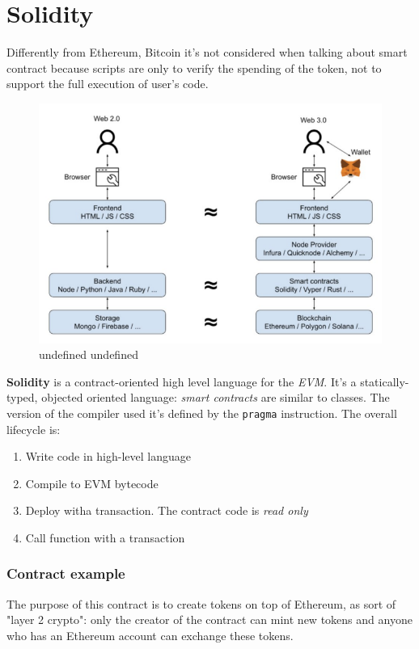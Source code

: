 \documentclass[10pt,a4paper]{report}
\begin{document}
\section{Solidity}\label{sec:solidity}
Differently from Ethereum, Bitcoin it's not considered when talking about smart contract because scripts are only to verify the spending of the token, not to support the full execution of user's code.
\begin{figure}[h!]
	\centering
	\includegraphics[scale=0.40]{images/Pasted image 20230421143519.png}
	\caption{undefined undefined}
\end{figure}


\textbf{Solidity} is a contract-oriented high level language for the \textit{EVM}. It's a statically-typed, objected oriented language: \textit{smart contracts} are similar to classes. The version of the compiler used it's defined by the \texttt{pragma} instruction.
The overall lifecycle is:
\begin{enumerate}
	\item 
	Write code in high-level language
	\item 
	Compile to EVM bytecode
	\item 
	Deploy witha  transaction. The contract code is \textit{read only}
	\item 
	Call function with a transaction
\end{enumerate}
\subsubsection{Contract example}\label{sec:contract-example}
The purpose of this contract is to create tokens on top of Ethereum, as sort of "layer 2 crypto": only the creator of the contract can mint new tokens and anyone who has an Ethereum account can exchange these tokens.
\end{document}
